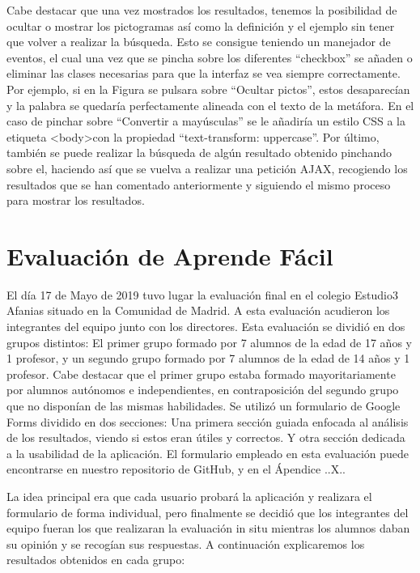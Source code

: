 Cabe destacar que una vez mostrados los resultados, tenemos la posibilidad de ocultar o mostrar los pictogramas así como la definición y el ejemplo sin tener que volver a realizar la búsqueda. Esto se consigue teniendo un manejador de eventos, el cual una vez que se pincha sobre los diferentes ``checkbox'' se añaden o eliminar las clases necesarias para que la interfaz se vea siempre correctamente. Por ejemplo, si en la Figura se pulsara sobre ``Ocultar pictos'', estos desaparecían y la palabra se quedaría perfectamente alineada con el texto de la metáfora. En el caso de pinchar sobre ``Convertir a mayúsculas'' se le añadiría un estilo CSS a la etiqueta <body>con la propiedad ``text-transform: uppercase''.
Por último, también se puede realizar la búsqueda de algún resultado obtenido pinchando sobre el, haciendo así que se vuelva a realizar una petición AJAX, recogiendo los resultados que se han comentado anteriormente y siguiendo el mismo proceso para mostrar los resultados.

\section{Evaluación de Aprende Fácil}

El día 17 de Mayo de 2019 tuvo lugar la evaluación final en el colegio Estudio3 Afanias situado en la Comunidad de Madrid. A esta evaluación acudieron los integrantes del equipo junto con los directores.
Esta evaluación se dividió en dos grupos distintos: El primer grupo formado por 7 alumnos de la edad de 17 años y 1 profesor, y un segundo grupo formado por 7 alumnos de la edad de 14 años y 1 profesor.
Cabe destacar que el primer grupo estaba formado mayoritariamente por alumnos autónomos e independientes, en contraposición del segundo grupo que no disponían de las mismas habilidades.
Se utilizó un formulario de Google Forms dividido en dos secciones: Una primera sección guiada enfocada al análisis de los resultados, viendo si estos eran útiles y correctos. Y otra sección dedicada a la usabilidad de la aplicación.
El formulario empleado en esta evaluación puede encontrarse en nuestro repositorio de GitHub, y en el Ápendice ..X..


La idea principal era que cada usuario probará la aplicación y realizara el formulario de forma individual, pero finalmente se decidió que los integrantes del equipo fueran los que realizaran la evaluación in situ mientras los alumnos daban su opinión y se recogían sus respuestas.
A continuación explicaremos los resultados obtenidos en cada grupo:

